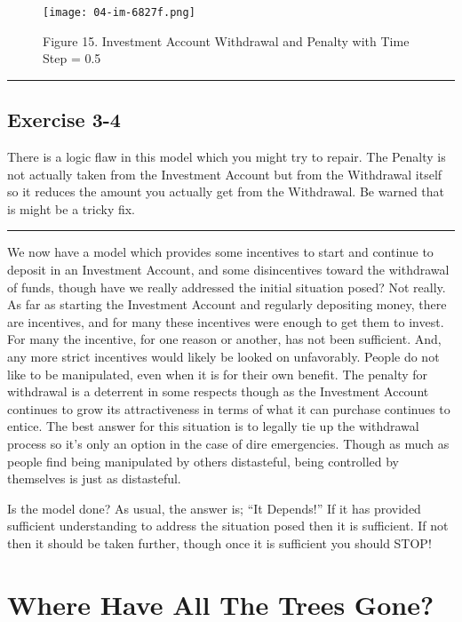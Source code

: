 \documentclass[]{memoir}
\let\Oldincludegraphics\includegraphics
\renewcommand{\includegraphics}[1]{\Oldincludegraphics[max size={\textwidth}{\textheight}]{#1}}
\begin{document}
\begin{figure}[htbp]
\centering
\texttt{[image: 04-im-6827f.png]}
\caption{Figure 15. Investment Account Withdrawal and Penalty with Time
Step = 0.5}
\end{figure}

\begin{center}\rule{3in}{0.4pt}\end{center}

\subsection{Exercise 3-4}

There is a logic flaw in this model which you might try to repair. The
Penalty is not actually taken from the Investment Account but from the
Withdrawal itself so it reduces the amount you actually get from the
Withdrawal. Be warned that is might be a tricky fix.

\begin{center}\rule{3in}{0.4pt}\end{center}

We now have a model which provides some incentives to start and continue
to deposit in an Investment Account, and some disincentives toward the
withdrawal of funds, though have we really addressed the initial
situation posed? Not really. As far as starting the Investment Account
and regularly depositing money, there are incentives, and for many these
incentives were enough to get them to invest. For many the incentive,
for one reason or another, has not been sufficient. And, any more strict
incentives would likely be looked on unfavorably. People do not like to
be manipulated, even when it is for their own benefit. The penalty for
withdrawal is a deterrent in some respects though as the Investment
Account continues to grow its attractiveness in terms of what it can
purchase continues to entice. The best answer for this situation is to
legally tie up the withdrawal process so it's only an option in the case
of dire emergencies. Though as much as people find being manipulated by
others distasteful, being controlled by themselves is just as
distasteful.

Is the model done? As usual, the answer is; ``It Depends!'' If it has
provided sufficient understanding to address the situation posed then it
is sufficient. If not then it should be taken further, though once it is
sufficient you should STOP!

\section{Where Have All The Trees Gone?}
\end{document}
